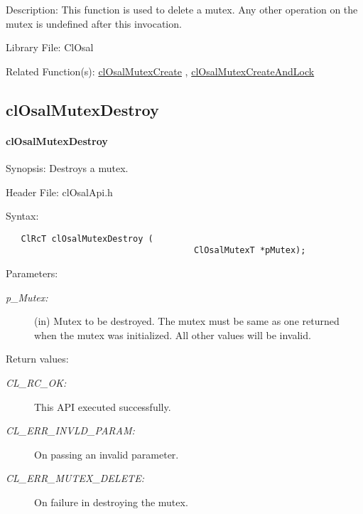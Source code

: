 \begin{Desc}
\item[Description:]This function is used to delete a mutex. Any other operation on the mutex is undefined after this invocation.\end{Desc}
\begin{Desc}
\item[Library File:]Cl\-Osal\end{Desc}
\begin{Desc}
\item[Related Function(s):]\hyperlink{pageosal111}{cl\-Osal\-Mutex\-Create} , \hyperlink{pageosal112}{cl\-Osal\-Mutex\-Create\-And\-Lock} \end{Desc}



\newpage
\subsection{clOsalMutexDestroy}
\hypertarget{pageosal156}{}\paragraph{cl\-Osal\-Mutex\-Destroy}\label{pageosal156}
\begin{Desc}
\item[Synopsis:]Destroys a mutex.\end{Desc}
\begin{Desc}
\item[Header File:]clOsalApi.h\end{Desc}
\begin{Desc}
\item[Syntax:]

\footnotesize\begin{verbatim}   ClRcT clOsalMutexDestroy (
 		                             ClOsalMutexT *pMutex);
\end{verbatim}
\normalsize
\end{Desc}
\begin{Desc}
\item[Parameters:]
\begin{description}
\item[{\em p\_Mutex:}](in) Mutex to be destroyed. The mutex 
 must be same as one returned when the mutex was
 initialized. All other values will be invalid.\end{description}
\end{Desc}
\begin{Desc}
\item[Return values:]
\begin{description}
\item[{\em CL\_\-RC\_\-OK:}]This API executed successfully. 
\item[{\em CL\_\-ERR\_\-INVLD\_\-PARAM:}]On passing an invalid parameter. 
\item[{\em CL\_\-ERR\_\-MUTEX\_\-DELETE:}]On failure in destroying the mutex.\end{description}
\end{Desc}
